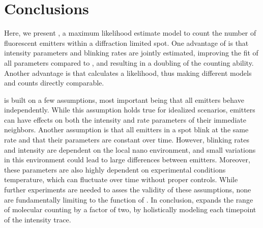 \section{Conclusions}

Here, we present \ours, a maximum likelihood estimate model to count the number of fluorescent emitters within a diffraction limited spot.
%
One advantage of \ours is that intensity parameters and blinking rates are jointly estimated, improving the fit of all parameters compared to \lbfcs, and resulting in a doubling of the counting ability. 
%
Another advantage is that \ours calculates a likelihood, thus making different models and counts directly comparable. 
%

\ours is built on a few assumptions, most important being that all emitters behave independently. While this assumption holds true for idealized scenarios, emitters can have effects on both the intensity and rate parameters of their immediate neighbors.
%
Another assumption is that all emitters in a spot blink at the same rate and that their parameters are constant over time. However, blinking rates and intensity are dependent on the local nano environment, and small variations in this environment could lead to large differences between emitters.
%
Moreover, these parameters are also highly dependent on experimental conditions \ie temperature, which can fluctuate over time without proper controls. 
%
While further experiments are needed to asses the validity of these assumptions, none are fundamentally limiting to the function of \ours. 
%
In conclusion, \ours expands the range of molecular counting by a factor of two, by holistically modeling each timepoint of the intensity trace.